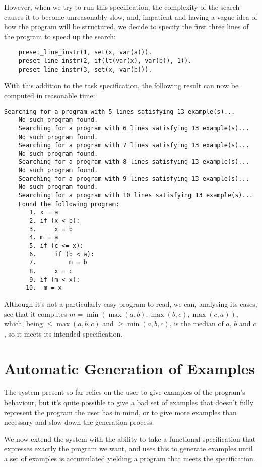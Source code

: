 \documentclass[a4paper,twoside,notitlepage]{report}
\begin{document}
However, when we try to run this specification, the complexity of the 
search causes it to become unreasonably slow, and, impatient and having a 
vague idea of how the program will be structured, we decide to specify the 
first three lines of the program to speed up the search:
\begin{Verbatim}[samepage=true]
    % Set x = max(a, b).
    preset_line_instr(1, set(x, var(a))).
    preset_line_instr(2, if(lt(var(x), var(b)), 1)).
    preset_line_instr(3, set(x, var(b))).
\end{Verbatim}

With this addition to the task specification, the following result can 
now be computed in reasonable time:
\begin{Verbatim}[samepage=true]
    Searching for a program with 5 lines satisfying 13 example(s)...
    No such program found.
    Searching for a program with 6 lines satisfying 13 example(s)...
    No such program found.
    Searching for a program with 7 lines satisfying 13 example(s)...
    No such program found.
    Searching for a program with 8 lines satisfying 13 example(s)...
    No such program found.
    Searching for a program with 9 lines satisfying 13 example(s)...
    No such program found.
    Searching for a program with 10 lines satisfying 13 example(s)...
    Found the following program:
       1. x = a
       2. if (x < b):
       3.     x = b
       4. m = a
       5. if (c <= x):
       6.     if (b < a):
       7.         m = b
       8.     x = c
       9. if (m < x):
      10.  m = x
\end{Verbatim}
Although it's not a particularly easy program to read, we can, analysing 
its cases, see that it computes $m=\min(\max(a,b),\max(b,c),\max(c,a))$, 
which, being $\leq \max(a,b,c)$ and $\geq \min(a,b,c)$, is the median of 
$a$, $b$ and $c$, so it meets its intended specification.

\chapter{Automatic Generation of Examples} \label{chp:genexm}

The system present so far relies on the user to give examples of the 
program's behaviour, but it's quite possible to give a bad set of examples 
that doesn't fully represent the program the user has in mind, or to give 
more examples than necessary and slow down the generation process.

We now extend the system with the ability to take a functional 
specification that expresses exactly the program we want, and uses this to 
generate examples until a set of examples is accumulated yielding a 
program that meets the specification.
\end{document}
